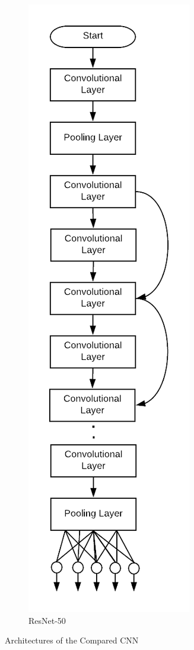 \documentclass[12pt]{article}
\begin{document}
\begin{figure}[b!]
\begin{subfigure}[b]{0.3\linewidth}
				\includegraphics[scale=0.25]{img/res50.png}
				\caption{ResNet-50}
				\label{fig:deep_rnn}
			\end{subfigure}
			\caption{Architectures of the Compared CNN}
			\label{fig:architecture}
		\end{figure}
\end{document}

